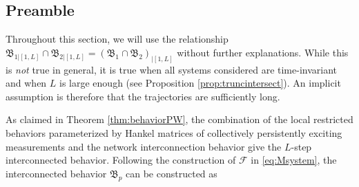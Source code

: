 \documentclass[11pt,print,draftcls,onecolumn,romanappendices]{ieeecolor}
\newcommand{\revise}[1]{{\color{black} #1}}
\newcommand{\B}{\mathfrak{B}}
\newcommand{\F}{\mathcal{F}}
\newcommand{\bint}[1]{{|[#1]}}
\begin{document}
\subsection{Preamble}\label{sec:preamble}
Throughout this section, we will use the relationship $\B_{1\bint{1,L}}\cap\B_{2\bint{1,L}}=(\B_1\cap\B_2)_\bint{1,L}$ without further explanations. While this is \emph{not} true in general, it is true when all systems considered are time-invariant and \revise{when} $L$ is large enough (see Proposition \ref{prop:truncintersect}). An implicit assumption is therefore that the trajectories \revise{are sufficiently long}.

As claimed in Theorem \ref{thm:behaviorPW}, the combination of the local restricted behaviors parameterized by Hankel matrices of collectively persistently exciting measurements and the network interconnection behavior give the $L$-step interconnected behavior. Following the construction of $\F $ in \eqref{eq:Msystem}, the interconnected behavior $\B_p$ can be constructed as
\end{document}
